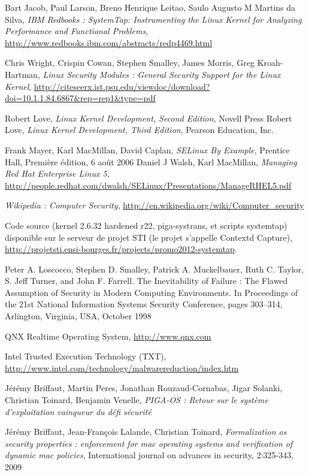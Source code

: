\documentclass[pdftex,a4paper,titlepage,11pt]{article}
\begin{document}
\begin{thebibliography}{40}

 Bart Jacob, Paul Larson, Breno Henrique Leitao, Saulo Augusto M Martins da Silva, \textit{IBM Redbooks : SystemTap: Instrumenting the Linux Kernel for Analyzing Performance and Functional Problems}, \url{http://www.redbooks.ibm.com/abstracts/redp4469.html}

 Chris Wright, Crispin Cowan, Stephen Smalley, James Morris, Greg Kroah-Hartman, \textit{Linux Security Modules : General Security Support for the Linux Kernel}, \url{http://citeseerx.ist.psu.edu/viewdoc/download?doi=10.1.1.84.6867&rep=rep1&type=pdf}

 Robert Love, \textit{Linux Kernel Development, Second Edition}, Novell Press
 Robert Love, \textit{Linux Kernel Development, Third Edition}, Pearson Education, Inc.

 Frank Mayer, Karl MacMillan, David Caplan, \textit{SELinux By Example}, Prentice Hall, Première édition, 6 août 2006
 Daniel J Walsh, Karl MacMillan, \textit{Managing Red Hat Enterprise Linux 5}, \url{http://people.redhat.com/dwalsh/SELinux/Presentations/ManageRHEL5.pdf}

 \textit{Wikipedia : Computer Security}, \url{http://en.wikipedia.org/wiki/Computer_security}

 Code source (kernel 2.6.32 hardened r22, piga-systrans, et scripts systemtap) disponible sur le serveur de projet STI (le projet s'appelle Contextd Capture), \url{http://projetsti.ensi-bourges.fr/projects/promo2012-systemtap}.

 Peter A. Loscocco, Stephen D. Smalley, Patrick A. Muckelbauer, Ruth C. Taylor, S. Jeff Turner, and John F. Farrell. The Inevitability of Failure : The Flawed Assumption of Security in Modern Computing Environments. In Proceedings of the 21st National Information Systems Security Conference, pages 303–314, Arlington, Virginia, USA, October 1998

 QNX Realtime Operating System, \url{http://www.qnx.com}

 Intel Trusted Execution Technology (TXT), \url{http://www.intel.com/technology/malwarereduction/index.htm}

 Jérémy Briffaut, Martin Peres, Jonathan Rouzaud-Cornabas, Jigar Solanki, Christian Toinard, Benjamin Venelle, \textit{PIGA-OS : Retour sur le système d'exploitation vainqueur du défi sécurité}

 Jérémy Briffaut, Jean-François Lalande, Christian Toinard, \textit{Formalization os security properties : enforcement for mac operating systems and verification of dynamic mac policies}, International journal on advances in security, 2:325-343, 2009

\end{thebibliography}

\end{document}
